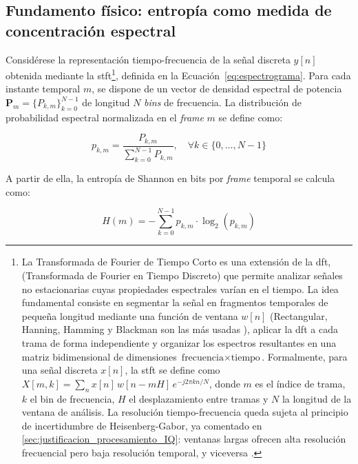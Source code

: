 \subsection{Fundamento físico: entropía como medida de concentración espectral}
\label{subsec:fundamento_entropia}

Considérese la representación tiempo-frecuencia de la señal discreta $y[n]$ obtenida mediante la \gls{stft}\footnote{La Transformada de Fourier de Tiempo Corto es una extensión de la \gls{dft}, (Transformada de Fourier en Tiempo Discreto) que permite analizar señales no estacionarias cuyas propiedades espectrales varían en el tiempo. La idea fundamental consiste en segmentar la señal en fragmentos temporales de pequeña longitud mediante una función de ventana $w[n]$ (Rectangular, Hanning, Hamming y Blackman son las más usadas \cite{zhang_window, harris_window}), aplicar la \gls{dft} a cada trama de forma independiente y organizar los espectros resultantes en una matriz bidimensional de dimensiones $\text{frecuencia} \times \text{tiempo}$. Formalmente, para una señal discreta $x[n]$, la \gls{stft} se define como $X[m, k] = \sum_{n} x[n]\, w[n - mH]\, e^{-j2\pi kn/N}$, donde $m$ es el índice de trama, $k$ el bin de frecuencia, $H$ el desplazamiento entre tramas y $N$ la longitud de la ventana de análisis. La resolución tiempo-frecuencia queda sujeta al principio de incertidumbre de Heisenberg-Gabor, ya comentado en \ref{sec:justificacion_procesamiento_IQ}: ventanas largas ofrecen alta resolución frecuencial pero baja resolución temporal, y viceversa \cite{oppenheim_discrete_2014}.}, definida en la Ecuación~\ref{eq:espectrograma}. Para cada instante temporal $m$, se dispone de un vector de densidad espectral de potencia $\mathbf{P}_m = \{P_{k,m}\}_{k=0}^{N-1}$ de longitud $N$ \textit{bins} de frecuencia. La distribución de probabilidad espectral normalizada en el \textit{frame} $m$ se define como:

\begin{equation}
    p_{k,m} = \frac{P_{k,m}}{\displaystyle\sum_{k=0}^{N-1} P_{k,m}}, \quad \forall k \in \{0, \ldots, N-1\}
    \label{eq:prob_espectral}
\end{equation}

A partir de ella, la entropía de Shannon en bits por \textit{frame} temporal se calcula como:

\begin{equation}
    H(m) = -\sum_{k=0}^{N-1} p_{k,m} \cdot \log_2\!\left(p_{k,m}\right)
    \label{eq:entropia_shannon}
\end{equation}


